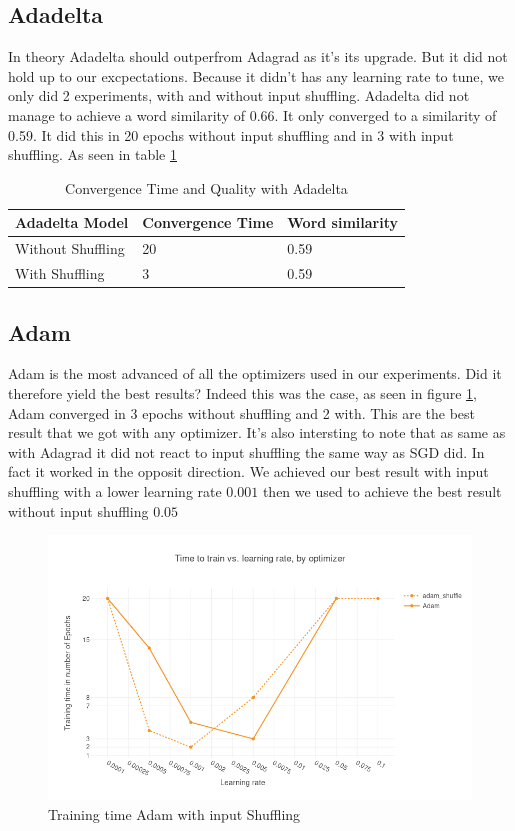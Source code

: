 \subsection{Adadelta}
In theory Adadelta should outperfrom Adagrad as it's its upgrade. But it did not hold up to our excpectations. Because it didn't has any learning rate to tune, we only did 2 experiments, with and without input shuffling. Adadelta did not manage to achieve a word similarity of 0.66. It only converged to a similarity of 0.59. It did this in 20 epochs without input shuffling and in 3 with input shuffling. As seen in table \ref{table:results_adadelta}
\begin{table}[h]
\centering
\begin{tabular}{|l|l|l|}
\hline
Adadelta Model    & Convergence Time & Word similarity \\ \hline
Without Shuffling & 20               & 0.59            \\ \hline
With Shuffling    & 3                & 0.59            \\ \hline
\end{tabular}
\caption{Convergence Time and Quality with Adadelta}
\label{table:results_adadelta}
\end{table}
\subsection{Adam}
Adam is the most advanced of all the optimizers used in our experiments. Did it therefore yield the best results? Indeed this was the case, as seen in figure \ref{fig:results_adam_shuffle}, Adam converged in 3 epochs without shuffling and 2 with. This are the best result that we got with any optimizer.  It's also intersting to note that as same as with Adagrad it did not react to input shuffling the same way as SGD did. In fact it worked in the opposit direction. We achieved our best result with input shuffling with a lower learning rate $0.001$ then we used to achieve the best result without input shuffling $0.05$
\begin{figure}[h]
    \centering
			\includegraphics[scale=0.45]{images/results_adam_shuffle} 
    \caption{Training time Adam with input Shuffling}
    \label{fig:results_adam_shuffle}
\end{figure}